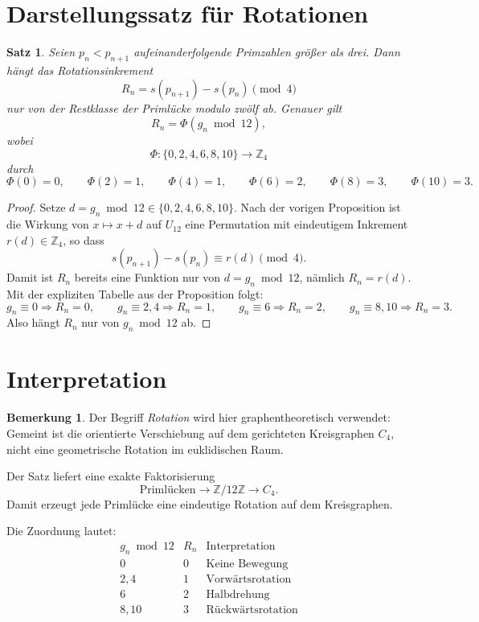 \documentclass[11pt]{article}
\newtheorem{theorem}{Satz}
\theoremstyle{definition}
\newtheorem{remark}{Bemerkung}
\begin{document}
\section{Darstellungssatz f\"ur Rotationen}

\begin{theorem}
Seien $p_n<p_{n+1}$ aufeinanderfolgende Primzahlen gr\"o{\ss}er als drei.
Dann h\"angt das Rotationsinkrement
\[
R_n=s(p_{n+1})-s(p_n)\pmod 4
\]
nur von der Restklasse der Priml\"ucke modulo zw\"olf ab.
Genauer gilt
\[
R_n=\Phi(g_n\bmod 12),
\]
wobei
\[
\Phi:\{0,2,4,6,8,10\}\rightarrow\mathbb{Z}_4
\]
durch
\[
\Phi(0)=0,\qquad
\Phi(2)=1,\qquad
\Phi(4)=1,\qquad
\Phi(6)=2,\qquad
\Phi(8)=3,\qquad
\Phi(10)=3.
\]
\end{theorem}

\begin{proof}
Setze $d=g_n\bmod 12\in\{0,2,4,6,8,10\}$.
Nach der vorigen Proposition ist die Wirkung von $x\mapsto x+d$ auf $U_{12}$
eine Permutation mit eindeutigem Inkrement $r(d)\in\mathbb{Z}_4$, so dass
\[
s(p_{n+1})-s(p_n)\equiv r(d)\pmod 4.
\]
Damit ist $R_n$ bereits eine Funktion nur von $d=g_n\bmod 12$, n\"amlich $R_n=r(d)$.
Mit der expliziten Tabelle aus der Proposition folgt:
\[
g_n\equiv0 \Rightarrow R_n=0,\qquad
g_n\equiv2,4 \Rightarrow R_n=1,\qquad
g_n\equiv6 \Rightarrow R_n=2,\qquad
g_n\equiv8,10 \Rightarrow R_n=3.
\]
Also h\"angt $R_n$ nur von $g_n \bmod 12$ ab.
\end{proof}

\section{Interpretation}

\begin{remark}
Der Begriff \emph{Rotation} wird hier graphentheoretisch verwendet:
Gemeint ist die orientierte Verschiebung auf dem gerichteten Kreisgraphen $C_4$,
nicht eine geometrische Rotation im euklidischen Raum.
\end{remark}

Der Satz liefert eine exakte Faktorisierung
\[
\text{Priml\"ucken}
\longrightarrow
\mathbb{Z}/12\mathbb{Z}
\longrightarrow
C_4.
\]
Damit erzeugt jede Priml\"ucke eine eindeutige Rotation auf dem Kreisgraphen.

Die Zuordnung lautet:
\[
\begin{array}{c|c|c}
g_n\bmod 12 & R_n & \text{Interpretation}\\
\hline
0 & 0 & \text{Keine Bewegung}\\
2,4 & 1 & \text{Vorw\"artsrotation}\\
6 & 2 & \text{Halbdrehung}\\
8,10 & 3 & \text{R\"uckw\"artsrotation}
\end{array}
\]
\end{document}

